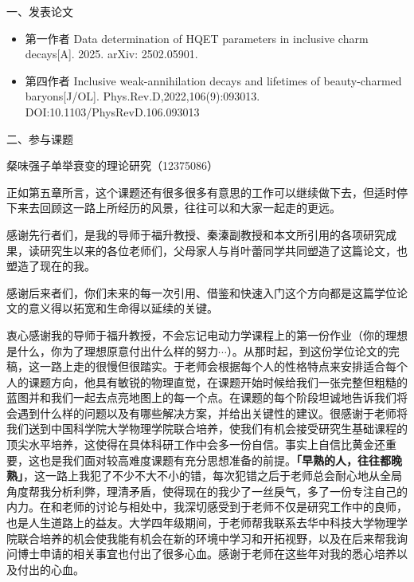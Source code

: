 \documentclass{LZUThesis-PgD&PhD}
\newcommand{\tb}[1]{\textbf{#1}}
\begin{document}
\blank


\backmatter


\printbib



\Achievements
一、发表论文
\begin{itemize}
    \item[1]第一作者 Data determination of HQET parameters in inclusive charm decays[A]. 2025. arXiv: 2502.05901.
    \item[2] 第四作者 Inclusive weak-annihilation decays and lifetimes of beauty-charmed baryons[J/OL]. Phys.Rev.D,2022,106(9):093013. DOI:10.1103/PhysRevD.106.093013
\end{itemize}
\blank

二、参与课题

粲味强子单举衰变的理论研究（12375086）

\Thanks
正如第五章所言，这个课题还有很多很多有意思的工作可以继续做下去，但适时停下来去回顾这一路上所经历的风景，往往可以和大家一起走的更远。

感谢先行者们，是我的导师于福升教授、秦溱副教授和本文所引用的各项研究成果，读研究生以来的各位老师们，父母家人与肖叶蕾同学共同塑造了这篇论文，也塑造了现在的我。

感谢后来者们，你们未来的每一次引用、借鉴和快速入门这个方向都是这篇学位论文的意义得以拓宽和生命得以延续的关键。

衷心感谢我的导师于福升教授，不会忘记电动力学课程上的第一份作业（你的理想是什么，你为了理想原意付出什么样的努力$\cdots$）。从那时起，到这份学位论文的完稿，这一路上走的很慢但很踏实。于老师会根据每个人的性格特点来安排适合每个人的课题方向，他具有敏锐的物理直觉，在课题开始时候给我们一张完整但粗糙的蓝图并和我们一起去点亮地图上的每一个点。在课题的每个阶段坦诚地告诉我们将会遇到什么样的问题以及有哪些解决方案，并给出关键性的建议。很感谢于老师将我们送到中国科学院大学物理学院联合培养，使我们有机会接受研究生基础课程的顶尖水平培养，这使得在具体科研工作中会多一份自信。事实上自信比黄金还重要，这也是我们面对较高难度课题有充分思想准备的前提。\tb{「早熟的人，往往都晚熟」}，这一路上我犯了不少不大不小的错，每次犯错之后于老师总会耐心地从全局角度帮我分析利弊，理清矛盾，使得现在的我少了一丝戾气，多了一份专注自己的内力。在和老师的讨论与相处中，我深切感受到于老师不仅是研究工作中的良师，也是人生道路上的益友。大学四年级期间，于老师帮我联系去华中科技大学物理学院联合培养的机会使我能有机会在新的环境中学习和开拓视野，以及在后来帮我询问博士申请的相关事宜也付出了很多心血。感谢于老师在这些年对我的悉心培养以及付出的心血。
\end{document}
